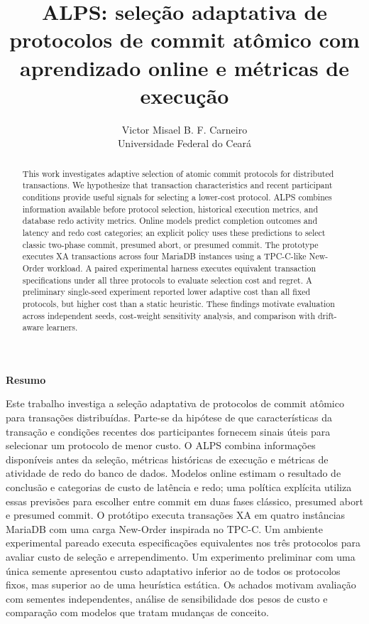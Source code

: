 \documentclass[12pt,a4paper]{article}
\title{ALPS: seleção adaptativa de protocolos de commit atômico com aprendizado online e métricas de execução}
\author{Victor Misael B. F. Carneiro\\Universidade Federal do Ceará}
\date{}
\begin{document}
\maketitle

\begin{abstract}
This work investigates adaptive selection of atomic commit protocols for distributed transactions. We hypothesize that transaction characteristics and recent participant conditions provide useful signals for selecting a lower-cost protocol. ALPS combines information available before protocol selection, historical execution metrics, and database redo activity metrics. Online models predict completion outcomes and latency and redo cost categories; an explicit policy uses these predictions to select classic two-phase commit, presumed abort, or presumed commit. The prototype executes XA transactions across four MariaDB instances using a TPC-C-like New-Order workload. A paired experimental harness executes equivalent transaction specifications under all three protocols to evaluate selection cost and regret. A preliminary single-seed experiment reported lower adaptive cost than all fixed protocols, but higher cost than a static heuristic. These findings motivate evaluation across independent seeds, cost-weight sensitivity analysis, and comparison with drift-aware learners.
\end{abstract}

\begin{center}\textbf{Resumo}\end{center}
Este trabalho investiga a seleção adaptativa de protocolos de commit atômico para transações distribuídas. Parte-se da hipótese de que características da transação e condições recentes dos participantes fornecem sinais úteis para selecionar um protocolo de menor custo. O ALPS combina informações disponíveis antes da seleção, métricas históricas de execução e métricas de atividade de redo do banco de dados. Modelos online estimam o resultado de conclusão e categorias de custo de latência e redo; uma política explícita utiliza essas previsões para escolher entre commit em duas fases clássico, presumed abort e presumed commit. O protótipo executa transações XA em quatro instâncias MariaDB com uma carga New-Order inspirada no TPC-C. Um ambiente experimental pareado executa especificações equivalentes nos três protocolos para avaliar custo de seleção e arrependimento. Um experimento preliminar com uma única semente apresentou custo adaptativo inferior ao de todos os protocolos fixos, mas superior ao de uma heurística estática. Os achados motivam avaliação com sementes independentes, análise de sensibilidade dos pesos de custo e comparação com modelos que tratam mudanças de conceito.
\end{document}
